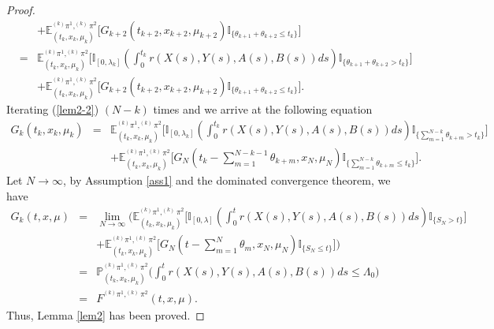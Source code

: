 \documentclass[12pt]{article}
\begin{document}
\begin{proof}
\begin{eqnarray}
&&+\mathbb{E}^{^{(k)}\pi^1,^{(k)}\pi^2}_{(t_k,x_k,\mu_k)}
\big[G_{k+2}(t_{k+2},x_{k+2},\mu_{k+2})\mathbb{I}_{\{\theta_{k+1}+\theta_{k+2}\leq t_k\}}\big]\nonumber\\
&=&\mathbb{E}^{^{(k)}\pi^1,^{(k)}\pi^2}_{(t_k,x_k,\mu_k)}
\big[\mathbb{I}_{[0,\lambda_k]}( \int_0^{t_k}r(X(s),Y(s),A(s),B(s))ds)
\mathbb{I}_{\{\theta_{k+1}+\theta_{k+2}>t_k\}}\big]\nonumber\\
&&+\mathbb{E}^{^{(k)}\pi^1,^{(k)}\pi^2}_{(t_k,x_k,\mu_k)}
\big[G_{k+2}(t_{k+2},x_{k+2},\mu_{k+2})\mathbb{I}_{\{\theta_{k+1}+\theta_{k+2}\leq t_k\}}\big].
\end{eqnarray}
Iterating (\ref{lem2-2}) $(N-k)$ times and we arrive at the following equation
\begin{eqnarray*}
G_k(t_k,x_k,\mu_k)
&=&\mathbb{E}^{^{(k)}\pi^1,^{(k)}\pi^2}_{(t_k,x_k,\mu_k)}
\big[\mathbb{I}_{[0,\lambda_k]}( \int_0^{t_k}r(X(s),Y(s),A(s),B(s))ds)
\mathbb{I}_{\{\sum_{m=1}^{N-k}\theta_{k+m}>t_k\}}\big]\nonumber\\
&&+\mathbb{E}^{^{(k)}\pi^1,^{(k)}\pi^2}_{(t_k,x_k,\mu_k)}
\big[G_N(t_k-\sum_{m=1}^{N-k-1}\theta_{k+m},x_N,\mu_N)
\mathbb{I}_{\{\sum_{m=1}^{N-k}\theta_{k+m}\leq t_k\}}\big].
\end{eqnarray*}
Let $N\to\infty$, by Assumption \ref{ass1} and the dominated convergence theorem, we have
\begin{eqnarray*}
G_k(t,x,\mu)&=&\lim_{N\to\infty}
\big(\mathbb{E}^{^{(k)}\pi^1,^{(k)}\pi^2}_{(t_k,x_k,\mu_k)}
\big[\mathbb{I}_{[0,\lambda]}( \int_0^{t}r(X(s),Y(s),A(s),B(s))ds)
\mathbb{I}_{\{S_N>t\}}\big]\nonumber\\
&&+\mathbb{E}^{^{(k)}\pi^1,^{(k)}\pi^2}_{(t_k,x_k,\mu_k)}
\big[G_N(t-\sum_{m=1}^{N}\theta_{m},x_N,\mu_N)
\mathbb{I}_{\{S_N\leq t\}}\big]\big)\\
&=&\mathbb{P}^{^{(k)}\pi^1,^{(k)}\pi^2}_{(t_k,x_k,\mu_k)}
\big( \int_0^{t}r(X(s),Y(s),A(s),B(s))ds\leq \Lambda_0)\nonumber\\
&=&F^{^{(k)}\pi^1,^{(k)}\pi^2}(t,x,\mu).
\end{eqnarray*}
Thus, Lemma \ref{lem2} has been proved.
\end{proof}
\end{document}
